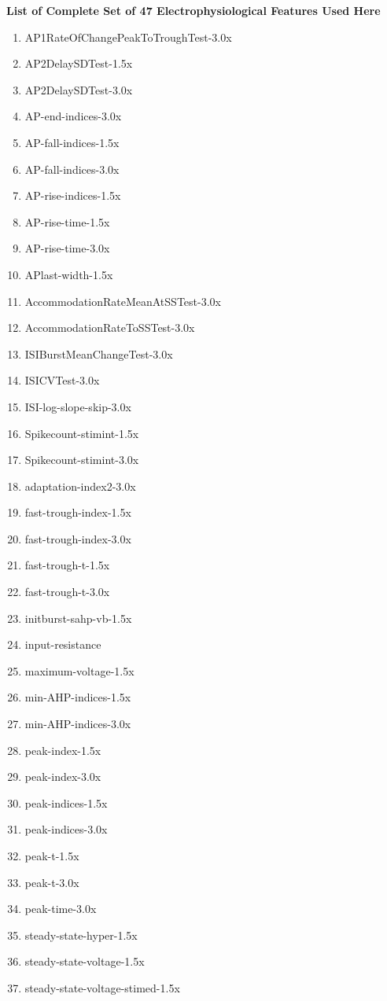 \clearpage
\textbf{List of Complete Set of 47 Electrophysiological Features Used Here}
\begin{enumerate}
\item AP1RateOfChangePeakToTroughTest-3.0x
\item AP2DelaySDTest-1.5x
\item AP2DelaySDTest-3.0x
\item AP-end-indices-3.0x
\item AP-fall-indices-1.5x
\item AP-fall-indices-3.0x
\item AP-rise-indices-1.5x
\item AP-rise-time-1.5x
\item AP-rise-time-3.0x
\item APlast-width-1.5x
\item AccommodationRateMeanAtSSTest-3.0x
\item AccommodationRateToSSTest-3.0x
\item ISIBurstMeanChangeTest-3.0x
\item ISICVTest-3.0x
\item ISI-log-slope-skip-3.0x
\item Spikecount-stimint-1.5x
\item Spikecount-stimint-3.0x
\item adaptation-index2-3.0x
\item fast-trough-index-1.5x
\item fast-trough-index-3.0x
\item fast-trough-t-1.5x
\item fast-trough-t-3.0x
\item initburst-sahp-vb-1.5x
\item input-resistance
\item maximum-voltage-1.5x
\item min-AHP-indices-1.5x
\item min-AHP-indices-3.0x
\item peak-index-1.5x
\item peak-index-3.0x
\item peak-indices-1.5x
\item peak-indices-3.0x
\item peak-t-1.5x
\item peak-t-3.0x
\item peak-time-3.0x
\item steady-state-hyper-1.5x
\item steady-state-voltage-1.5x
\item steady-state-voltage-stimed-1.5x

\end{enumerate}
